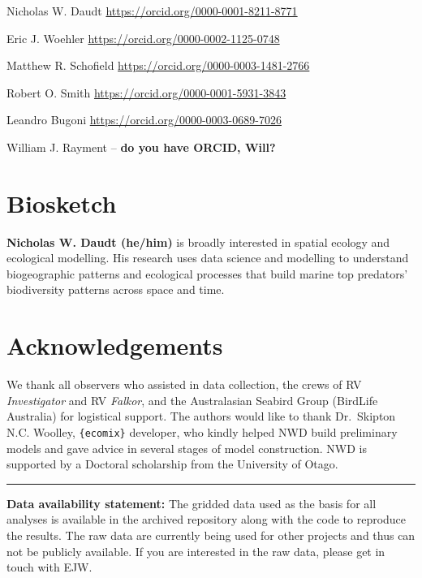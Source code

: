 \documentclass{article}
\begin{document}
Nicholas W. Daudt \url{https://orcid.org/0000-0001-8211-8771}

Eric J. Woehler \url{https://orcid.org/0000-0002-1125-0748}

Matthew R. Schofield \url{https://orcid.org/0000-0003-1481-2766}

Robert O. Smith \url{https://orcid.org/0000-0001-5931-3843}

Leandro Bugoni \url{https://orcid.org/0000-0003-0689-7026}

William J. Rayment -- \textbf{do you have ORCID, Will?}

\hypertarget{biosketch}{%
\section*{Biosketch}\label{biosketch}}

\textbf{Nicholas W. Daudt (he/him)} is broadly interested in spatial ecology and ecological modelling. His research uses data science and modelling to understand biogeographic patterns and ecological processes that build marine top predators' biodiversity patterns across space and time.

\hypertarget{acknowledgements}{%
\section*{Acknowledgements}\label{acknowledgements}}

We thank all observers who assisted in data collection, the crews of RV \emph{Investigator} and RV \emph{Falkor}, and the Australasian Seabird Group (BirdLife Australia) for logistical support. The authors would like to thank Dr.~Skipton N.C. Woolley, \texttt{\{ecomix\}} developer, who kindly helped NWD build preliminary models and gave advice in several stages of model construction. NWD is supported by a Doctoral scholarship from the University of Otago.

\begin{center}\rule{0.5\linewidth}{0.5pt}\end{center}

\textbf{Data availability statement:} The gridded data used as the basis for all analyses is available in the archived repository along with the code to reproduce the results. The raw data are currently being used for other projects and thus can not be publicly available. If you are interested in the raw data, please get in touch with EJW.
\end{document}
